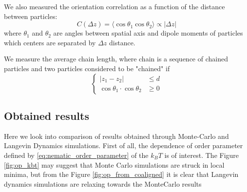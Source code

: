 We also measured the orientation correlation as a function of the distance between particles:
\begin{equation}
	C(\Delta z) = \langle \cos \theta_1 \cos \theta_2\rangle \propto |\Delta z|
\end{equation}
where $\theta_1$ and $\theta_2$ are angles between spatial axis and dipole moments of particles which centers are separated by $\Delta z$ distance.

We measure the average chain length, where chain is a sequence of chained particles and two particles considered to be "chained" if 
\begin{equation}
\begin{cases}
	|z_1 - z_2| &\leq d \\
	\cos \theta_1 \cdot \cos \theta_2 &\geq 0
\end{cases}
\end{equation}

\subsection{Obtained results}
\label{subsec:obtained_results}
Here we look into comparison of results obtained through Monte-Carlo and Langevin Dynamics simulations. First of all, the dependence of order parameter defined by \eqref{eq:nematic_order_parameter} of the $k_BT$ is of interest. The Figure \ref{fig:op_kbt} may suggest that Monte Carlo simulations are struck in local minima, but from the Figure \ref{fig:op_from_coaligned} it is clear that Langevin dynamics simulations are relaxing towards the MonteCarlo results
%


